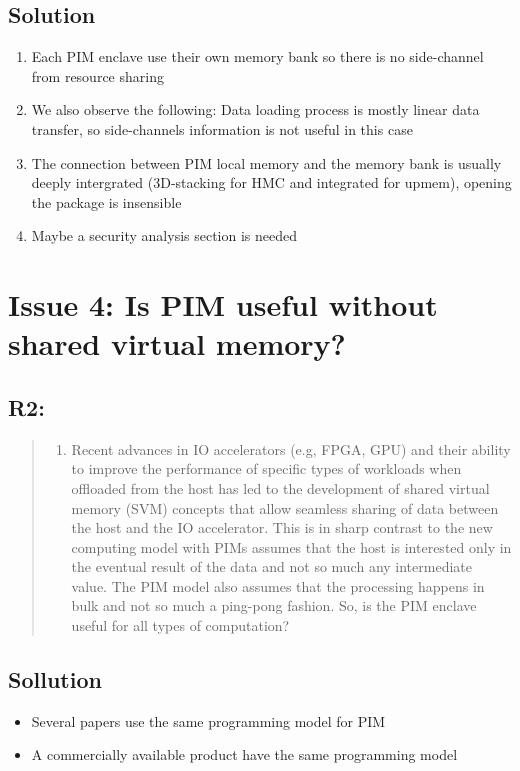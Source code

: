 \documentclass[11pt]{article}
\begin{document}
\subsection{Solution}
\label{sec:org47e6273}
\begin{enumerate}
\item Each PIM enclave use their own memory bank so there is no side-channel from resource sharing
\item We also observe the following: Data loading process is mostly linear data transfer, so side-channels information is not useful in this case
\item The connection between PIM local memory and the memory bank is usually deeply intergrated (3D-stacking for HMC and integrated for upmem), opening the package is insensible
\item Maybe a security analysis section is needed
\end{enumerate}

\section{Issue 4: Is PIM useful without shared virtual memory?}
\label{sec:orge499911}
\subsection{R2:}
\label{sec:org770c866}
\begin{quote}
\begin{enumerate}
\item Recent advances in IO accelerators (e.g, FPGA, GPU) and their ability to improve the performance of specific types of workloads when offloaded from the host has led to the development of shared virtual memory (SVM) concepts that allow seamless sharing of data between the host and the IO accelerator. This is in sharp contrast to the new computing model with PIMs assumes that the host is interested only in the eventual result of the data and not so much any intermediate value. The PIM model also assumes that the processing happens in bulk and not so much a ping-pong fashion. So, is the PIM enclave useful for all types of computation?
\end{enumerate}
\end{quote}
\subsection{Sollution}
\label{sec:org0ffc141}
\begin{itemize}
\item Several papers use the same programming model for PIM
\item A commercially available product have the same programming model
\end{itemize}
\end{document}

